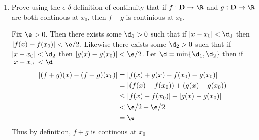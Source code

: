 \documentclass[11pt]{exam}
\begin{document}
\begin{enumerate}
        \item Prove using the $\epsilon$-$\delta$ definition of continuity that if $f: \textbf{D} \to \R$ and $g: \textbf{D} \to \R$ are both continous at $x_0$, then $f + g$ is continious at $x_0$.
            
            \begin{solution}
                Fix $\e > 0$. Then there exists some $\d_1 > 0$ such that if $|x - x_0| < \d_1$ then $|f(x) - f(x_0)| < \e/2$. Likewise there exists some $\d_2 > 0$ such that if $|x - x_0| < \d_2$ then $|g(x) - g(x_0)| < \e/2$. Let $\d = \min\{\d_1, \d_2\}$ then if $|x - x_0| < \d$ 
                \begin{align*}
                    |(f+g)(x) - (f+g)(x_0)| &= |f(x) + g(x) - f(x_0) - g(x_0)| \\
                                            &= |(f(x) - f(x_0)) + (g(x) - g(x_0))| \\
                                            &\le |f(x) - f(x_0)| + |g(x) - g(x_0)| \\
                                            &<  \e/2 + \e/2 \\
                                            &= \e 
                \end{align*}
                Thus by definition, $f + g$ is continous at $x_0$
            \end{solution}



\end{enumerate}
\end{document}
